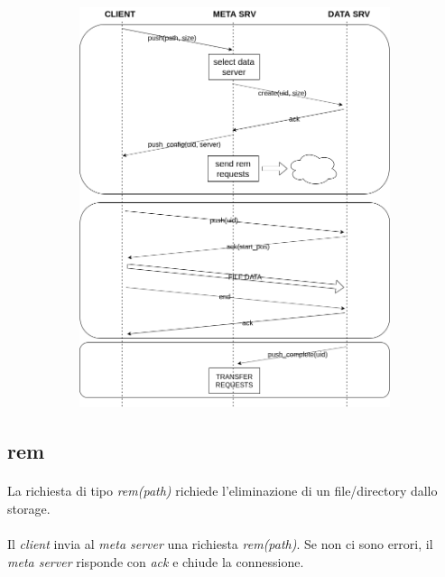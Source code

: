\documentclass{article}
\begin{document}
\begin{figure}[H]
	\centering
	\begin{subfigure}{0.80\linewidth}
		\includegraphics[width=\linewidth]{../diagrams/requests/push_request.png}
	\end{subfigure}
\end{figure}


\subsection{rem}

\paragraph{} La richiesta di tipo \emph{rem(path)} richiede l'eliminazione di un file/directory dallo storage.

\paragraph{} Il \emph{client} invia al \emph{meta server} una richiesta \emph{rem(path)}. Se non ci sono errori, il \emph{meta server} risponde con \emph{ack} e chiude la connessione.
\end{document}
